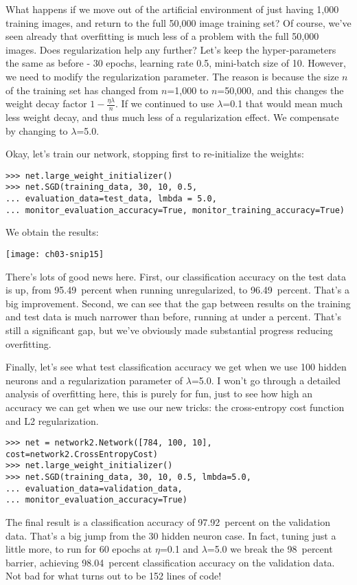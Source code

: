 What happens if we move out of the artificial environment of just having 1,000 training images, and return to the full 50,000 image training set? Of course, we've seen already that overfitting is much less of a problem with the full 50,000 images. Does regularization help any further? Let's keep the hyper-parameters the same as before - 30 epochs, learning rate 0.5, mini-batch size of 10. However, we need to modify the regularization parameter. The reason is because the size $n$ of the training set has changed from $n$=1,000 to $n$=50,000, and this changes the weight decay factor $1-\frac{\eta \lambda}{n}$. If we continued to use $\lambda$=0.1 that would mean much less weight decay, and thus much less of a regularization effect. We compensate by changing to $\lambda$=5.0.

Okay, let's train our network, stopping first to re-initialize the weights: 
 \begin{lstlisting}
>>> net.large_weight_initializer()
>>> net.SGD(training_data, 30, 10, 0.5,
... evaluation_data=test_data, lmbda = 5.0,
... monitor_evaluation_accuracy=True, monitor_training_accuracy=True)
\end{lstlisting}
We obtain the results:
\begin{marginfigure}
\texttt{[image: ch03-snip15]}
\end{marginfigure}
There's lots of good news here. First, our classification accuracy on the test data is up, from 95.49~percent when running unregularized, to 96.49~percent. That's a big improvement. Second, we can see that the gap between results on the training and test data is much narrower than before, running at under a percent. That's still a significant gap, but we've obviously made substantial progress reducing overfitting.

Finally, let's see what test classification accuracy we get when we use 100 hidden neurons and a regularization parameter of $\lambda$=5.0. I won't go through a detailed analysis of overfitting here, this is purely for fun, just to see how high an accuracy we can get when we use our new tricks: the cross-entropy cost function and L2 regularization.
 \begin{lstlisting}
>>> net = network2.Network([784, 100, 10], cost=network2.CrossEntropyCost)
>>> net.large_weight_initializer()
>>> net.SGD(training_data, 30, 10, 0.5, lmbda=5.0,
... evaluation_data=validation_data,
... monitor_evaluation_accuracy=True)
\end{lstlisting}
The final result is a classification accuracy of 97.92~percent on the validation data. That's a big jump from the 30 hidden neuron case. In fact, tuning just a little more, to run for 60 epochs at $\eta$=0.1 and $\lambda$=5.0 we break the 98~percent barrier, achieving 98.04~percent classification accuracy on the validation data. Not bad for what turns out to be 152 lines of code!

